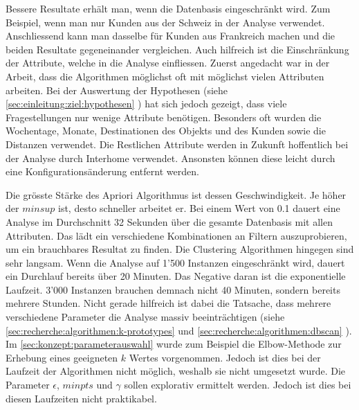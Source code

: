 Bessere Resultate erhält man, wenn die Datenbasis eingeschränkt wird. Zum Beispiel, wenn man nur Kunden aus der Schweiz in der Analyse verwendet. Anschliessend kann man dasselbe für Kunden aus Frankreich machen und die beiden Resultate gegeneinander vergleichen. Auch hilfreich ist die Einschränkung der Attribute, welche in die Analyse einfliessen. Zuerst angedacht war in der Arbeit, dass die Algorithmen möglichst oft mit möglichst vielen Attributen arbeiten. Bei der Auswertung der Hypothesen (siehe \cref{sec:einleitung:ziel:hypothesen} ) hat sich jedoch gezeigt, dass viele Fragestellungen nur wenige Attribute benötigen. Besonders oft wurden die Wochentage, Monate, Destinationen des Objekts und des Kunden sowie die Distanzen verwendet. Die Restlichen Attribute werden in Zukunft hoffentlich bei der Analyse durch Interhome verwendet. Ansonsten können diese leicht durch eine Konfigurationsänderung entfernt werden.

Die grösste Stärke des Apriori Algorithmus ist dessen Geschwindigkeit. Je höher der $minsup$ ist, desto schneller arbeitet er. Bei einem Wert von 0.1 dauert eine Analyse im Durchschnitt 32 Sekunden über die gesamte Datenbasis mit allen Attributen. Das lädt ein verschiedene Kombinationen an Filtern auszuprobieren, um ein brauchbares Resultat zu finden. Die Clustering Algorithmen hingegen sind sehr langsam. Wenn die Analyse auf 1'500 Instanzen eingeschränkt wird, dauert ein Durchlauf bereits über 20 Minuten. Das Negative daran ist die exponentielle Laufzeit. 3'000 Instanzen brauchen demnach nicht 40 Minuten, sondern bereits mehrere Stunden. Nicht gerade hilfreich ist dabei die Tatsache, dass mehrere verschiedene Parameter die Analyse massiv beeinträchtigen (siehe \cref{sec:recherche:algorithmen:k-prototypes}  und \cref{sec:recherche:algorithmen:dbscan} ). Im \cref{sec:konzept:parameterauswahl}  wurde zum Beispiel die Elbow-Methode zur Erhebung eines geeigneten $k$ Wertes vorgenommen. Jedoch ist dies bei der Laufzeit der Algorithmen nicht möglich, weshalb sie nicht umgesetzt wurde. Die Parameter $\epsilon$, $minpts$ und $\gamma$ sollen explorativ ermittelt werden. Jedoch ist dies bei diesen Laufzeiten nicht praktikabel. 

